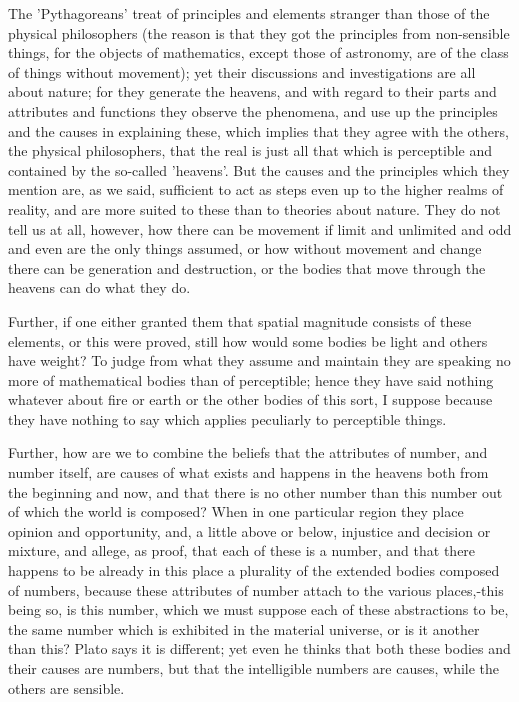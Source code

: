 \documentclass{article}
\begin{document}
The 'Pythagoreans' treat of principles and elements stranger than those of the physical philosophers (the reason is that they got the principles from non-sensible things, for the objects of mathematics, except those of astronomy, are of the class of things without movement); yet their discussions and investigations are all about nature; for they generate the heavens, and with regard to their parts and attributes and functions they observe the phenomena, and use up the principles and the causes in explaining these, which implies that they agree with the others, the physical philosophers, that the real is just all that which is perceptible and contained by the so-called 'heavens'. But the causes and the principles which they mention are, as we said, sufficient to act as steps even up to the higher realms of reality, and are more suited to these than to theories about nature. They do not tell us at all, however, how there can be movement if limit and unlimited and odd and even are the only things assumed, or how without movement and change there can be generation and destruction, or the bodies that move through the heavens can do what they do.

Further, if one either granted them that spatial magnitude consists of these elements, or this were proved, still how would some bodies be light and others have weight? To judge from what they assume and maintain they are speaking no more of mathematical bodies than of perceptible; hence they have said nothing whatever about fire or earth or the other bodies of this sort, I suppose because they have nothing to say which applies peculiarly to perceptible things.

Further, how are we to combine the beliefs that the attributes of number, and number itself, are causes of what exists and happens in the heavens both from the beginning and now, and that there is no other number than this number out of which the world is composed? When in one particular region they place opinion and opportunity, and, a little above or below, injustice and decision or mixture, and allege, as proof, that each of these is a number, and that there happens to be already in this place a plurality of the extended bodies composed of numbers, because these attributes of number attach to the various places,-this being so, is this number, which we must suppose each of these abstractions to be, the same number which is exhibited in the material universe, or is it another than this? Plato says it is different; yet even he thinks that both these bodies and their causes are numbers, but that the intelligible numbers are causes, while the others are sensible.
\end{document}
